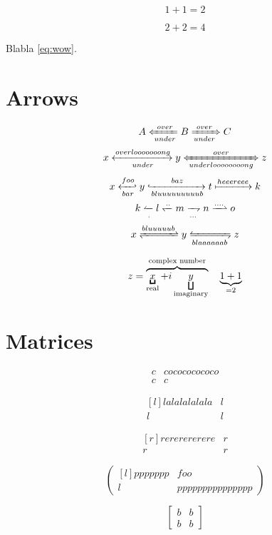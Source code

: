 \documentclass{article}
\begin{document}
\begin{equation*}
1+1=2 \label{eq:much}
\end{equation*}

\begin{equation*}
2+2=4 \label{eq:wow}
\end{equation*}

Blabla \eqref{eq:wow}.

\section{Arrows}

\[
A \xLeftarrow[under]{over} B \xRightarrow[under]{over} C
\]
\[
x \xleftrightarrow[under]{overlooooooong} y \xLeftrightarrow[underloooooooong]{over} z
\]
\[
x \xhookleftarrow[bar]{foo} y \xhookrightarrow[bluuuuuuuuub]{baz} t \xmapsto{heeereee} k
\]
\[
k \xleftharpoonup[.]{} l \xleftharpoondown{..} m \xrightharpoondown[...]{} n \xrightharpoonup{....} o
\]
\[
x \xrightleftharpoons{bluuuuub} y \xleftrightharpoons[blaaaaaab]{} z
\]


\[
z = \LaTeXoverbrace{
   \underbracket{x}_\text{real} + i
      \underbracket[1pt][7pt]{y}_\text{imaginary}
        }^\text{complex number}
\quad
\underbrace{1+1}_{=2}
\]

\section{Matrices}

\[
\begin{matrix*}
c & cocococococo \\
c & c
\end{matrix*}
\]

\[
\begin{matrix*}[l]
lalalalalala & l \\
l & l
\end{matrix*}
\]

\[
\begin{matrix*}[r]
rererererere & r \\
r & r
\end{matrix*}
\]

\[
\begin{pmatrix*}[l]
ppppppp & foo \\
l & ppppppppppppppp
\end{pmatrix*}
\]

\[
\begin{bmatrix*}
b & b \\
b & b
\end{bmatrix*}
\]
\end{document}
